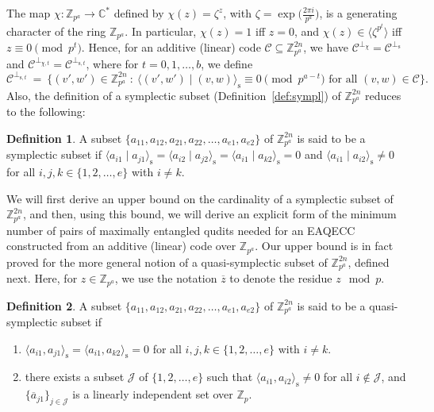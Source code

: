 \documentclass{article}
\theoremstyle{remark}
\theoremstyle{definition}
\newtheorem{defin}{Definition}[section]
\numberwithin{equation}{section}
\begin{document}
The map $\chi: \mathbb{Z}_{p^a} \to \mathbb{C}^*$ defined by $\chi(z) = \zeta^z$, with $\zeta=\exp\bigl(\frac{2 \pi i}{p^a}\bigr)$, is a generating character of the ring $\mathbb{Z}_{p^a}$. In particular, $\chi(z) = 1$ iff $z = 0$, and $\chi(z) \in \langle \zeta^{p^t} \rangle $ iff $z \equiv 0 \pmod{p^t}$. Hence, for an additive (linear) code $\mathcal{C} \subseteq \mathbb{Z}_{p^a}^{2n}$, we have $\mathcal{C}^{\perp_\chi}=\mathcal{C}^{\perp_{\mathrm{s}}}$ and $\mathcal{C}^{\perp_{\chi,t}}=\mathcal{C}^{\perp_{\mathrm{s},t}}$, where for $t = 0,1,\ldots,b$, we define
\begin{equation}
\label{def:Cperp_st} 
\mathcal{C}^{\perp_{\mathrm{s},t}} \ = \  \{(v',w') \in \mathbb{Z}_{p^a}^{2n} ~:~ \langle(v',w') \mid (v,w) \rangle_{\mathrm{s}} \equiv 0 \!\!\!\! \pmod{p^{a-t}} \text{ for all } (v,w) \in \mathcal{C}\}.
\end{equation}
%
Also, the definition of a symplectic subset (Definition~\ref{def:sympl}) of $\mathbb{Z}_{p^a}^{2n}$ reduces to the following:
\begin{defin} \label{def:sympl2} A subset $\{a_{11},a_{12},a_{21},a_{22},\ldots,a_{e1},a_{e2}\}$
 of $\mathbb{Z}_{p^a}^{2n}$ is said to be a symplectic subset if
  $\langle a_{i1} \mid a_{j1} \rangle_{\mathrm{s}} = \langle a_{i2} \mid a_{j2} \rangle_{\mathrm{s}} = \langle a_{i1} \mid a_{k 2} \rangle_{\mathrm{s}} = 0$ and  $\langle a_{i1} \mid a_{i2} \rangle_{\mathrm{s}} \neq 0$ for all $i ,j, k \in \{1,2,\ldots,e\}$ with $i \neq k.$
 \end{defin}

We will first derive an upper bound on the cardinality of a symplectic subset of $\mathbb{Z}_{p^a}^{2n}$, and then, using this bound, we will derive an explicit form of the minimum number of pairs of maximally entangled qudits needed for an EAQECC constructed from an additive (linear) code over $\mathbb{Z}_{p^a}.$   Our upper bound is in fact proved for the more general notion of a quasi-symplectic subset of ${\mathbb{Z}^{2n}_{p^a}}$, defined next. Here, for $z \in \mathbb{Z}_{p^a}$, we use the notation $\overline{z}$ to denote the residue $z \!\! \mod p$. 
\begin{defin} A subset $\{a_{11},a_{12},a_{21},a_{22},\ldots,a_{e1},a_{e2}\}$
 of ${\mathbb{Z}^{2n}_{p^a}}$ is said to be a quasi-symplectic subset if
 \begin{enumerate}
 \item[(a)] $\langle a_{i1}, a_{j1} \rangle_{\mathrm{s}}=\langle a_{i1}, a_{k 2} \rangle_{\mathrm{s}}=0$ for all $i ,j, k  \in \{1,2,\ldots,e\}$ with $i \neq k.$
 \item[(b)] there exists a subset $\mathcal{J}$ of $\{1,2,\ldots,e \}$ such that $\langle a_{i1}, a_{i2} \rangle_{\mathrm{s}}\neq0$ for all $i \not\in \mathcal{J}$, and $\{\overline{a}_{j1} \}_{j \in \mathcal{J}}$ is a linearly independent set over $\mathbb{Z}_p.$
 \end{enumerate}
\end{defin}
\end{document}
